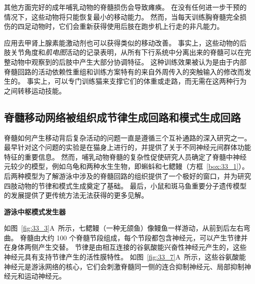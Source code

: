 其他方面完好的成年哺乳动物的脊髓损伤会导致瘫痪。
在没有任何进一步干预的情况下，这些动物将只能恢复最小的移动能力。
然而，当每天训练胸脊髓完全损伤的四足动物时，它们会重新获得使用后肢在跑步机上行走的非凡能力。


应用去甲肾上腺素能激动剂也可以获得类似的移动改善。
事实上，这些动物的后肢关节角度和\textit{肌电图}活动的记录表明，从所有下行系统中分离出来的脊髓可以在完整动物中观察到的后肢中产生大部分协调特征。
这种训练效果被认为是由于内部脊髓回路的活动依赖性重组和训练方案特有的来自外周传入的突触输入的修改而发生的。
事实上，可以专门训练猫来支撑它们的体重或走路，而无需在这两种行为之间转移运动技能。



\subsection{脊髓移动网络被组织成节律生成回路和模式生成回路}

脊髓如何产生移动背后复杂活动的问题一直是遵循三个互补通路的深入研究之一。
最早针对这个问题的实验是在猫身上进行的，并提供了关于不同神经元间群体功能特征的重要信息。
然而，哺乳动物脊髓的复杂性促使研究人员确定了脊髓中神经元较少的模型，例如乌龟和两种水生生物，即蝌蚪和七鳃鳗（方框~\ref{box:33_1}）。
后两种模型为了解游泳中涉及的脊髓回路的组织提供了一个极好的窗口，并为研究四肢动物的节律和模式生成奠定了基础。
最后，小鼠和斑马鱼重要分子遗传模型的发展提供了更传统方法无法获得的更多见解。


\textbf{游泳中枢模式发生器}

如图~\ref{fig:33_3}A~所示，七鳃鳗（一种无颌鱼）像鳗鱼一样游动，从前到后左右弯曲。
脊髓由大约 100 个脊髓节段组成，每个节段都包含神经元，可以产生节律并在身体两侧产生交替。
节律是由相互连接的谷氨酸能兴奋性神经元产生的，这些神经元具有支持节律产生的活性膜特性。
如图~\ref{fig:33_7}A~所示，这些谷氨酸能神经元是游泳网络的核心，它们会刺激脊髓同一侧的连合抑制神经元、局部抑制神经元和运动神经元。


